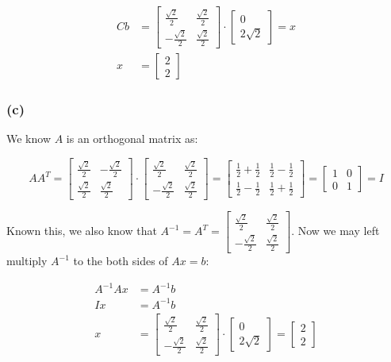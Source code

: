 \documentclass[11pt]{article}
\providecommand{\qbm}[1]{\begin{bmatrix} #1 \end{bmatrix}}
\begin{document}
\begin{align*}
    C b &= \qbm{\frac{\sqrt{2}}{2} & \frac{\sqrt{2}}{2} \\ -\frac{\sqrt{2}}{2} & \frac{\sqrt{2}}{2}} \cdot \qbm{0 \\ 2 \sqrt{2}} = x\\
    x &= \qbm{2 \\ 2}
\end{align*}

\subsubsection*{(c)}

We know $A$ is an orthogonal matrix as:

\begin{equation*}
    A A^{T} =  \qbm{\frac{\sqrt{2}}{2} & -\frac{\sqrt{2}}{2} \\ \frac{\sqrt{2}}{2} & \frac{\sqrt{2}}{2}}  \cdot \qbm{\frac{\sqrt{2}}{2} & \frac{\sqrt{2}}{2} \\ -\frac{\sqrt{2}}{2} & \frac{\sqrt{2}}{2}} = \qbm{\frac{1}{2} + \frac{1}{2} & \frac{1}{2} - \frac{1}{2} \\ \frac{1}{2} - \frac{1}{2} & \frac{1}{2} + \frac{1}{2}} = \qbm{1 & 0 \\ 0 & 1} = I
\end{equation*}

Known this, we also know that $A^{-1} = A^T = \qbm{\frac{\sqrt{2}}{2} & \frac{\sqrt{2}}{2} \\ -\frac{\sqrt{2}}{2} & \frac{\sqrt{2}}{2}}$. Now we may left multiply $A^{-1}$ to the both sides of $Ax = b$:

\begin{align*}
    A^{-1} A x &= A^{-1} b \\
    I x &= A^{-1} b \\
    x &= \qbm{\frac{\sqrt{2}}{2} & \frac{\sqrt{2}}{2} \\ -\frac{\sqrt{2}}{2} & \frac{\sqrt{2}}{2}} \cdot \qbm{0 \\ 2 \sqrt{2}} = \qbm{2 \\ 2}
\end{align*}
\end{document}
